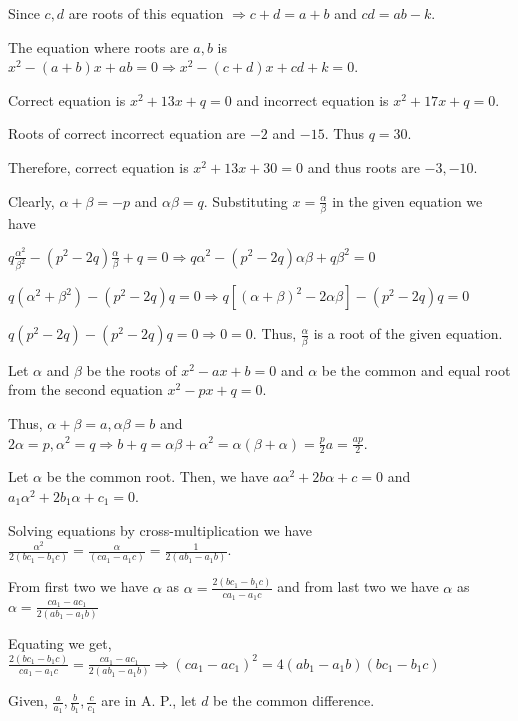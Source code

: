   Since $c, d$ are roots of this equation $\Rightarrow c + d = a + b$ and $cd = ab - k$.

  The equation where roots are $a, b$ is $x^2 - (a + b)x + ab = 0 \Rightarrow x^2 - (c + d)x + cd + k = 0$.
\item Correct equation is $x^2 + 13x + q = 0$ and incorrect equation is $x^2 + 17x + q = 0$.

  Roots of correct incorrect equation are $-2$ and $-15.$ Thus $q = 30$.

  Therefore, correct equation is $x^2 + 13x + 30 = 0$ and thus roots are $-3, -10$.
\item Clearly, $\alpha + \beta = -p$ and $\alpha\beta = q$. Substituting $x = \frac{\alpha}{\beta}$ in the
  given equation we have

  $q\frac{\alpha^2}{\beta^2} - (p^2 - 2q)\frac{\alpha}{\beta} + q = 0 \Rightarrow q\alpha^2 - (p^2 -
  2q)\alpha\beta + q\beta^2 = 0$

  $q(\alpha^2 + \beta^2) - (p^2 - 2q)q = 0 \Rightarrow q[(\alpha + \beta)^2 - 2\alpha\beta] - (p^2 - 2q)q = 0$

  $q(p^2 - 2q) - (p^2 - 2q)q = 0 \Rightarrow 0 = 0$. Thus, $\frac{\alpha}{\beta}$ is a root of the given
  equation.
\item Let $\alpha$ and $\beta$ be the roots of $x^2 - ax + b = 0$ and $\alpha$ be the common and equal root
  from the second equation $x^2 - px + q = 0$.

  Thus, $\alpha + \beta = a, \alpha\beta = b$ and $2\alpha = p, \alpha^2 = q\Rightarrow b + q =
  \alpha\beta + \alpha^2 = \alpha(\beta + \alpha) = \frac{p}{2}a = \frac{ap}{2}$.
\item Let $\alpha$ be the common root. Then, we have $a\alpha^2 + 2b\alpha + c = 0$ and $a_1\alpha^2 + 2b_1\alpha + c_1 = 0$.

  Solving equations by cross-multiplication we have $\frac{\alpha^2}{2(bc_1 - b_1c)} = \frac{\alpha}{(ca_1 -
    a_1c)} = \frac{1}{2(ab_1 - a_1b)}$.

  From first two we have $\alpha$ as $\alpha = \frac{2(bc_1 - b_1c)}{ca_1 - a_1c}$ and from last two we have
  $\alpha$ as $\alpha = \frac{ca_1 - ac_1}{2(ab_1 - a_1b)}$

  Equating we get, $\frac{2(bc_1 - b_1c)}{ca_1 - a_1c} = \frac{ca_1 - ac_1}{2(ab_1 - a_1b)}\Rightarrow (ca_1
  - ac_1)^2 = 4(ab_1 - a_1b)(bc_1 - b_1c)$

  Given, $\frac{a}{a_1}, \frac{b}{b_1}, \frac{c}{c_1}$ are in A. P., let $d$ be the common difference.

